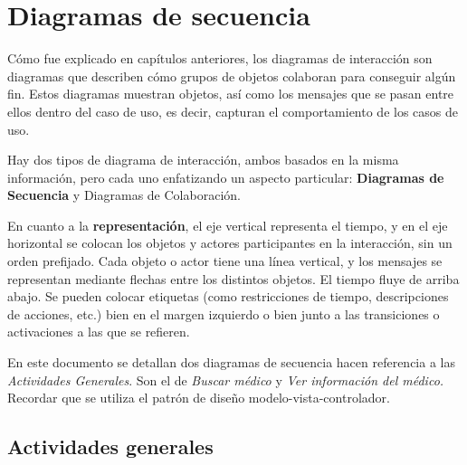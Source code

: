\documentclass[a4paper,oneside,11pt]{book}
\begin{document}
	
	\newpage
	\section{Diagramas de secuencia} %
\label{sec:diagramas_de_secuencia}

	Cómo fue explicado en capítulos anteriores, los diagramas de interacción son diagramas que describen cómo grupos de objetos colaboran para conseguir algún fin. Estos diagramas muestran objetos, así como los mensajes que se pasan entre ellos dentro del caso de uso, es decir, capturan el comportamiento de los casos de uso.
	
	Hay dos tipos de diagrama de interacción, ambos basados en la misma información, pero cada uno enfatizando un aspecto particular: \textbf{Diagramas de Secuencia} y Diagramas de Colaboración.

	\medskip
	
	
	\medskip
	
	En cuanto a la \textbf{representación}, el eje vertical representa el tiempo, y en el eje horizontal se colocan los objetos y actores participantes en la interacción, sin un orden prefijado. Cada objeto o actor tiene una línea vertical, y los mensajes se representan mediante flechas entre los distintos objetos. El tiempo fluye de arriba abajo. Se pueden colocar etiquetas (como restricciones de tiempo, descripciones de acciones, etc.) bien en el margen izquierdo o bien junto a las transiciones o activaciones a las que se refieren. 
	
	En este documento se detallan dos diagramas de secuencia hacen referencia a las \textit{Actividades Generales}. Son el de \textit{Buscar médico} y \textit{Ver información del médico.} Recordar que se utiliza el patrón de diseño modelo-vista-controlador.

	\newpage
	\subsection{Actividades generales} %
	\label{sub:actividades_generales}
	
\end{document}
